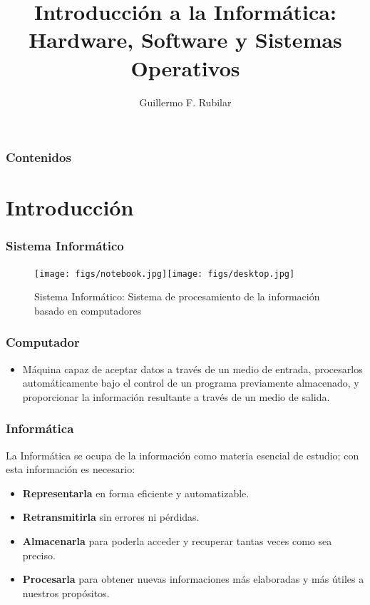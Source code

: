 \documentclass[aspectratio=169]{beamer}
\begin{document}
\title[PC-OS]{Introducción a la Informática: \\
Hardware, Software y Sistemas Operativos}
\author[G.R.]{Guillermo F. Rubilar}
\frame{\titlepage}


\begin{frame}
\frametitle{Contenidos}
\tableofcontents
\end{frame}


\section{Introducción}
\begin{frame}[fragile]\frametitle{Sistema Informático}
\begin{figure}
\begin{center}
\texttt{[image: figs/notebook.jpg]}\hspace{1cm}\texttt{[image: figs/desktop.jpg]}
\end{center}
\caption{Sistema Informático: Sistema de procesamiento de la información basado en computadores}
\end{figure}
\end{frame}

\begin{frame}[fragile]\frametitle{Computador}
\begin{itemize}
\item Máquina capaz de aceptar datos a través de un medio de entrada, procesarlos automáticamente bajo el control de un programa previamente almacenado, y proporcionar la información resultante a través de un medio de salida.
\end{itemize}
\end{frame}

\begin{frame}[fragile]\frametitle{Informática}
La Informática se ocupa de la información como materia esencial de estudio; con esta información es necesario:
\begin{itemize}
\item \textbf{Representarla} en forma eficiente y automatizable.
\item \textbf{Retransmitirla} sin errores ni pérdidas.
\item \textbf{Almacenarla} para poderla acceder y recuperar tantas veces como sea preciso.
\item \textbf{Procesarla} para obtener nuevas informaciones más elaboradas y más útiles a nuestros propósitos.
\end{itemize}
\end{frame}
\end{document}
